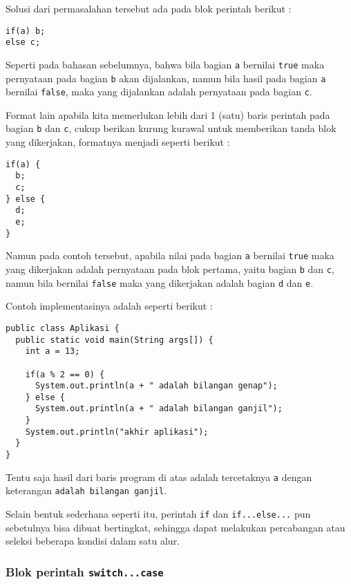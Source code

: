 Solusi dari permasalahan tersebut ada pada blok perintah berikut :

\begin{lstlisting}
if(a) b;
else c;
\end{lstlisting}

Seperti pada bahasan sebelumnya, bahwa bila bagian \texttt{a} bernilai \texttt{true} maka pernyataan pada bagian \texttt{b} akan dijalankan, namun bila hasil pada bagian \texttt{a} bernilai \texttt{false}, maka yang dijalankan adalah pernyataan pada bagian \texttt{c}.

Format lain apabila kita memerlukan lebih dari 1 (satu) baris perintah pada bagian \texttt{b} dan \texttt{c}, cukup berikan kurung kurawal untuk memberikan tanda blok yang dikerjakan, formatnya menjadi seperti berikut :

\begin{lstlisting}
if(a) {
  b;
  c;
} else {
  d;
  e;
}
\end{lstlisting}

Namun pada contoh tersebut, apabila nilai pada bagian \texttt{a} bernilai \texttt{true} maka yang dikerjakan adalah pernyataan pada blok pertama, yaitu bagian \texttt{b} dan \texttt{c}, namun bila bernilai \texttt{false} maka yang dikerjakan adalah bagian \texttt{d} dan \texttt{e}.

Contoh implementasinya adalah seperti berikut :

\begin{lstlisting}
public class Aplikasi {
  public static void main(String args[]) {
    int a = 13;
    
    if(a % 2 == 0) {
      System.out.println(a + " adalah bilangan genap");
    } else {
      System.out.println(a + " adalah bilangan ganjil");
    }
    System.out.println("akhir aplikasi");
  }
}
\end{lstlisting}

Tentu saja hasil dari baris program di atas adalah tercetaknya \texttt{a} dengan keterangan \texttt{adalah bilangan ganjil}.

Selain bentuk sederhana seperti itu, perintah \texttt{if} dan \texttt{if...else...} pun sebetulnya bisa dibuat bertingkat, sehingga dapat melakukan percabangan atau seleksi beberapa kondisi dalam satu alur.

\subsubsection{Blok perintah \texttt{switch...case}}

